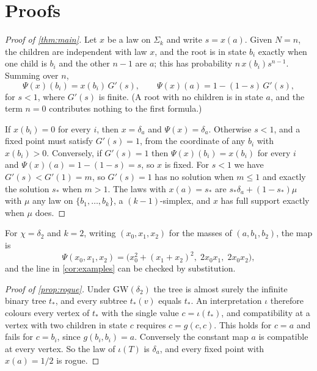 \documentclass[11pt]{amsart}
\theoremstyle{remark}
\newcommand{\GW}{\mathrm{GW}}
\begin{document}
\section{Proofs}

\begin{proof}[Proof of \cref{thm:main}]
Let $x$ be a law on $\Sigma_k$ and write $s=x(a)$. Given $N=n$, the children are independent with law $x$, and the root is in state $b_i$ exactly when one child is $b_i$ and the other $n-1$ are $a$; this has probability $n\,x(b_i)s^{n-1}$. Summing over $n$,
\[
\Psi(x)(b_i)=x(b_i)\,G'(s),\qquad \Psi(x)(a)=1-(1-s)\,G'(s),
\]
for $s<1$, where $G'(s)$ is finite. (A root with no children is in state $a$, and the term $n=0$ contributes nothing to the first formula.)

If $x(b_i)=0$ for every $i$, then $x=\delta_a$ and $\Psi(x)=\delta_a$. Otherwise $s<1$, and a fixed point must satisfy $G'(s)=1$, from the coordinate of any $b_i$ with $x(b_i)>0$. Conversely, if $G'(s)=1$ then $\Psi(x)(b_i)=x(b_i)$ for every $i$ and $\Psi(x)(a)=1-(1-s)=s$, so $x$ is fixed. For $s<1$ we have $G'(s)<G'(1)=m$, so $G'(s)=1$ has no solution when $m\le1$ and exactly the solution $s_*$ when $m>1$. The laws with $x(a)=s_*$ are $s_*\delta_a+(1-s_*)\mu$ with $\mu$ any law on $\{b_1,\dots,b_k\}$, a $(k-1)$-simplex, and $x$ has full support exactly when $\mu$ does.
\end{proof}

For $\chi=\delta_2$ and $k=2$, writing $(x_0,x_1,x_2)$ for the masses of $(a,b_1,b_2)$, the map is
\[
\Psi(x_0,x_1,x_2)=\bigl(x_0^2+(x_1+x_2)^2,\; 2x_0x_1,\; 2x_0x_2\bigr),
\]
and the line in \cref{cor:examples} can be checked by substitution.

\begin{proof}[Proof of \cref{prop:rogue}]
Under $\GW(\delta_2)$ the tree is almost surely the infinite binary tree $t_*$, and every subtree $t_*(v)$ equals $t_*$. An interpretation $\iota$ therefore colours every vertex of $t_*$ with the single value $c=\iota(t_*)$, and compatibility at a vertex with two children in state $c$ requires $c=g(c,c)$. This holds for $c=a$ and fails for $c=b_i$, since $g(b_i,b_i)=a$. Conversely the constant map $a$ is compatible at every vertex. So the law of $\iota(T)$ is $\delta_a$, and every fixed point with $x(a)=1/2$ is rogue.
\end{proof}
\end{document}
